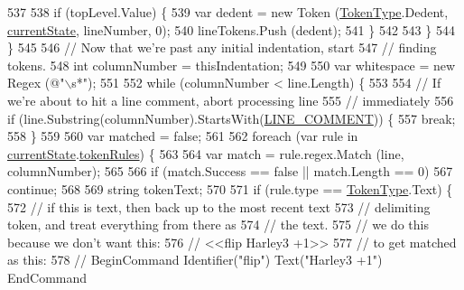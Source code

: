 \begin{DoxyCode}
537 
538                     \textcolor{keywordflow}{if} (topLevel.Value) \{
539                         var dedent = \textcolor{keyword}{new} Token (\hyperlink{a00031_a301aa7c866593a5b625a8fc158bbeace}{TokenType}.Dedent, 
      \hyperlink{a00101_ac90b7dce8103425a148f9e8588f14137}{currentState}, lineNumber, 0);
540                         lineTokens.Push (dedent);
541                     \}
542 
543                 \}
544             \}
545 
546             \textcolor{comment}{// Now that we're past any initial indentation, start}
547             \textcolor{comment}{// finding tokens.}
548             \textcolor{keywordtype}{int} columnNumber = thisIndentation;
549 
550             var whitespace = \textcolor{keyword}{new} Regex (\textcolor{stringliteral}{@"\(\backslash\)s*"});
551 
552             \textcolor{keywordflow}{while} (columnNumber < line.Length) \{
553 
554                 \textcolor{comment}{// If we're about to hit a line comment, abort processing line}
555                 \textcolor{comment}{// immediately}
556                 \textcolor{keywordflow}{if} (line.Substring(columnNumber).StartsWith(\hyperlink{a00101_a29c457125cc4876f8571f5d9afa372e2}{LINE\_COMMENT})) \{
557                     \textcolor{keywordflow}{break};
558                 \}
559 
560                 var matched = \textcolor{keyword}{false};
561 
562                 \textcolor{keywordflow}{foreach} (var rule \textcolor{keywordflow}{in} \hyperlink{a00101_ac90b7dce8103425a148f9e8588f14137}{currentState}.\hyperlink{a00102_adf6563b1dc6f3ef80ed13c2b15b7be03}{tokenRules}) \{
563                     
564                     var match = rule.regex.Match (line, columnNumber);
565 
566                     \textcolor{keywordflow}{if} (match.Success == \textcolor{keyword}{false} || match.Length == 0)
567                         \textcolor{keywordflow}{continue};
568 
569                     \textcolor{keywordtype}{string} tokenText;
570 
571                     \textcolor{keywordflow}{if} (rule.type == \hyperlink{a00031_a301aa7c866593a5b625a8fc158bbeace}{TokenType}.Text) \{
572                         \textcolor{comment}{// if this is text, then back up to the most recent text }
573                         \textcolor{comment}{// delimiting token, and treat everything from there as}
574                         \textcolor{comment}{// the text.}
575                         \textcolor{comment}{// we do this because we don't want this:}
576                         \textcolor{comment}{//    <<flip Harley3 +1>>}
577                         \textcolor{comment}{// to get matched as this:}
578                         \textcolor{comment}{//    BeginCommand Identifier("flip") Text("Harley3 +1") EndCommand}

\end{DoxyCode}

